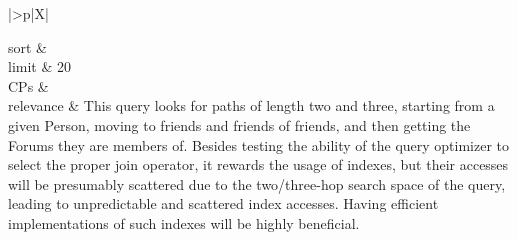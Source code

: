 \begin{tabularx}{\queryCardWidth}{|>{\queryPropertyCell}p{\queryPropertyCellWidth}|X|}
%
	
		sort		&
		\innerCardVSpace \\ \hline
	limit & 20 \\ \hline
	CPs &
	 \\ \hline
	relevance &
		\small This query looks for paths of length two and three, starting from a given Person, moving to friends and friends of
friends, and then getting the Forums they are members of. Besides testing the ability of the query optimizer to select
the proper join operator, it rewards the usage of indexes, but their accesses will be presumably scattered due to the
two/three-hop search space of the query, leading to unpredictable and scattered index accesses. Having efficient
implementations of such indexes will be highly beneficial.
 \\ \hline%
\end{tabularx}
\queryCardVSpace